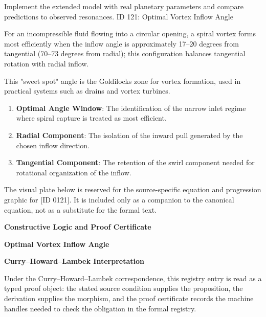 Implement the extended model with real planetary parameters and compare predictions to observed resonances. ID 121: Optimal Vortex Inflow Angle

For an incompressible fluid flowing into a circular opening, a spiral vortex forms most efficiently when the inflow angle is approximately 17--20 degrees from tangential (70--73 degrees from radial); this configuration balances tangential rotation with radial inflow.

This "sweet spot" angle is the Goldilocks zone for vortex formation, used in practical systems such as drains and vortex turbines.
\endgroup

\begin{enumerate}[leftmargin=1.6em,itemsep=6pt,topsep=4pt]
\item \textbf{Optimal Angle Window}: The identification of the narrow inlet regime where spiral capture is treated as most efficient.
\item \textbf{Radial Component}: The isolation of the inward pull generated by the chosen inflow direction.
\item \textbf{Tangential Component}: The retention of the swirl component needed for rotational organization of the inflow.
\end{enumerate}

\begingroup\footnotesize\sloppy
The visual plate below is reserved for the source-specific equation and progression graphic for [ID 0121]. It is included only as a companion to the canonical equation, not as a substitute for the formal text.
\par\endgroup
\ifTZPDarkEdition
{}
\fi

\clearpage
\begingroup\tzpsupportsetup
\noindent\textbf{\fontsize{10.8pt}{12.8pt}\selectfont [ID 0121] Constructive Logic and Proof Certificate}\par
\noindent\textbf{\fontsize{10pt}{12pt}\selectfont Optimal Vortex Inflow Angle}\par
\vspace{0.45em}
\begingroup
\footnotesize
\setlength{\parskip}{0.22em}
\setlength{\parindent}{0pt}
\noindent\textbf{Curry--Howard--Lambek Interpretation}\par
Under the Curry--Howard--Lambek correspondence, this registry entry is read as a typed proof
object: the stated source condition supplies the proposition, the derivation supplies the
morphism, and the proof certificate records the machine handles needed to check the obligation
in the formal registry.


